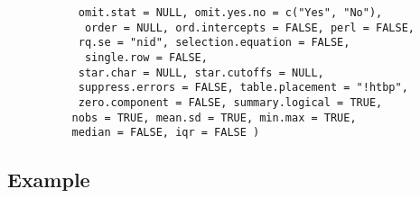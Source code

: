 \documentclass[11pt]{article}
\begin{document}
 \verb+           omit.stat = NULL, omit.yes.no = c("Yes", "No"), +\\
\verb+            order = NULL, ord.intercepts = FALSE, perl = FALSE, +\\
 \verb+           rq.se = "nid", selection.equation = FALSE, +\\
\verb+            single.row = FALSE,+\\
 \verb+           star.char = NULL, star.cutoffs = NULL, +\\
 \verb+           suppress.errors = FALSE, table.placement = "!htbp", +\\
 \verb+           zero.component = FALSE, summary.logical = TRUE, +\\
  \verb+          nobs = TRUE, mean.sd = TRUE, min.max = TRUE,  +\\
  \verb+          median = FALSE, iqr = FALSE ) +\\


\subsection*{Example}
\end{document}
